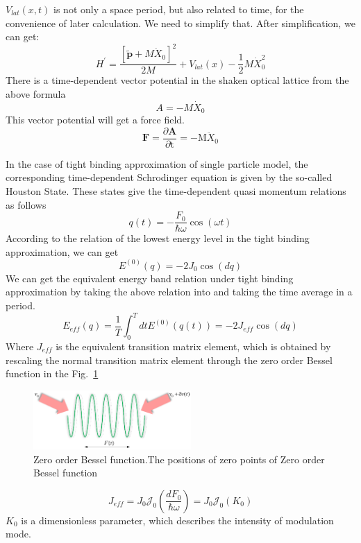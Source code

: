 \documentclass[
 reprint,
 amsmath,amssymb,
 aps,
pra,
floatfix,
]{revtex4-2}
\begin{document}
$V_{l a t}(x, t)$ is not only a space period, but also related to time, for the convenience of later calculation. 
We need to simplify that. After simplification, we can get:%
\begin{equation}
  H^{\prime}=\frac{\left[\widetilde{\boldsymbol{p}}+M \dot{X}_{0}\right]^{2}}{2 M}+V_{l a t}(x)-\frac{1}{2} M \dot{X}_{0}^{2}
  \label{eq4}
\end{equation}
There is a time-dependent vector potential in the shaken optical lattice from the above formula
\begin{equation}
  A=-M \dot{X}_{0}
  \label{eq5}
\end{equation}
This vector potential will get a force field.
\begin{equation}
  \mathbf{F}=\frac{\partial \mathbf{A}}{\partial \mathrm{t}}=-\mathrm{M} \ddot{X}_{0}
  \label{eq6}
\end{equation}

In the case of tight binding approximation of single particle model, 
the corresponding time-dependent Schrodinger equation is given by the so-called Houston State.
These states give the time-dependent quasi momentum relations as follows
\begin{equation}
  q(t)=-\frac{F_{0}}{\hbar \omega} \cos (\omega t)
  \label{eq7}
\end{equation}
According to the relation of the lowest energy level in the tight binding approximation, we can get
\begin{equation}
  E^{(0)}(q)=-2 J_{0} \cos (d q)
\end{equation}
We can get the equivalent energy band relation under tight binding approximation by taking the above relation into and taking the time average in a period.
\begin{equation}
  E_{e f f}(q)=\frac{1}{T} \int_{0}^{T} d t E^{(0)}(q(t))=-2 J_{e f f} \cos (d q)
\end{equation}
Where $J_{e f f}$ is the equivalent transition matrix element, 
which is obtained by rescaling the normal transition matrix element through the zero order Bessel function in the Fig.~\ref{fig2}
\begin{figure}[b]
  \includegraphics[width = 6cm]{fig2.eps}
  \caption{\label{fig2} Zero order Bessel function.The positions of zero points of Zero order Bessel function}
\end{figure}
\begin{equation}
  J_{e f f}=J_{0} \mathcal{J}_{0}\left(\frac{d F_{0}}{\hbar \omega}\right)=J_{0} \mathcal{J}_{0}\left(K_{0}\right)
\end{equation}
$K_{0}$ is a dimensionless parameter, which describes the intensity of modulation mode.
\end{document}
